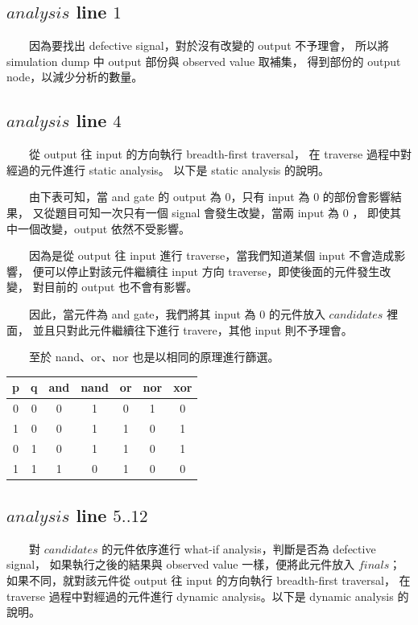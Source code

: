 \documentclass[12pt,a4paper]{article}
\begin{document}
\subsection{$analysis$ line $1$}

　　因為要找出 defective signal，對於沒有改變的 output 不予理會，%
所以將 simulation dump 中 output 部份與 observed value 取補集，%
得到部份的 output node，以減少分析的數量。%

\subsection{$analysis$ line $4$}

　　從 output 往 input 的方向執行 breadth-first traversal，%
在 traverse 過程中對經過的元件進行 static analysis。%
以下是 static analysis 的說明。

　　由下表可知，當 and gate 的 output 為 $0$，只有 input 為 $0$ 的部份會影響結果，%
又從題目可知一次只有一個 signal 會發生改變，當兩 input 為 $0$ ，%
即使其中一個改變，output 依然不受影響。

　　因為是從 output 往 input 進行 traverse，當我們知道某個 input 不會造成影響，%
便可以停止對該元件繼續往 input 方向 traverse，即使後面的元件發生改變，%
對目前的 output 也不會有影響。

　　因此，當元件為 and gate，我們將其 input 為 $0$ 的元件放入 $candidates$ 裡面，%
並且只對此元件繼續往下進行 travere，其他 input 則不予理會。

　　至於 nand、or、nor 也是以相同的原理進行篩選。

\begin{center}
\begin{tabular}{|c|c|c|c|c|c|c|}
\hline
p & q & and & nand & or & nor & xor\\
\hline
0 & 0 & 0   & 1    & 0  & 1   & 0\\
\hline
1 & 0 & 0   & 1    & 1  & 0   & 1\\
\hline
0 & 1 & 0   & 1    & 1  & 0   & 1\\
\hline
1 & 1 & 1   & 0    & 1  & 0   & 0\\
\hline
\end{tabular}
\end{center}

\subsection{$analysis$ line $5..12$}

　　對 $candidates$ 的元件依序進行 what-if analysis，判斷是否為 defective signal，%
如果執行之後的結果與 observed value 一樣，便將此元件放入 $finals$；%
如果不同，就對該元件從 output 往 input 的方向執行 breadth-first traversal，%
在 traverse 過程中對經過的元件進行 dynamic analysis。以下是 dynamic analysis 的說明。
\end{document}
